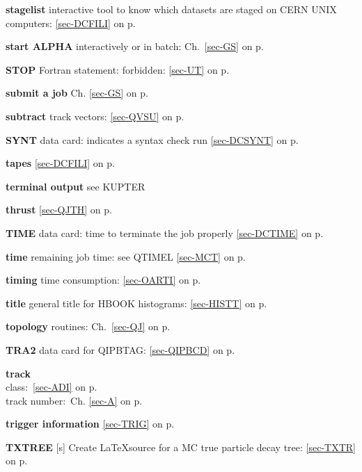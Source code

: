  \item{\bf stagelist  }interactive tool to know which datasets are staged on CERN UNIX computers:
                           \ref{sec-DCFILI} on p.~\pageref{sec-DCFILI}\\
 \item{\bf start ALPHA }interactively or in batch: Ch.~\ref{sec-GS} on p.~\pageref{sec-GS}\\
 \item{\bf STOP    }Fortran statement: forbidden:
 \ref{sec-UT} on p.~\pageref{sec-UT}\\
 \item{\bf submit a job    }Ch. \ref{sec-GS} on p.~\pageref{sec-GS}\\
 \item{\bf subtract    }track vectors: \ref{sec-QVSU} on p.~\pageref{sec-QVSU}\\
 \item{\bf SYNT    }data card: indicates a syntax check run
 \ref{sec-DCSYNT} on p.~\pageref{sec-DCSYNT}
 
 
 \item{\bf tapes }\ref{sec-DCFILI} on p.~\pageref{sec-DCFILI}\\
 \item{\bf terminal output }see KUPTER\\
 \item{\bf thrust }\ref{sec-QJTH} on p.~\pageref{sec-QJTH}\\
 \item{\bf TIME    }data card: time to terminate the job properly
 \ref{sec-DCTIME} on p.~\pageref{sec-DCTIME}\\
 \item{\bf time    }remaining job time: see QTIMEL \ref{sec-MCT} on p.~\pageref{sec-MCT}\\
 \item{\bf timing  }time consumption: \ref{sec-OARTI} on p.~\pageref{sec-OARTI}\\
 \item{\bf title   }general title for HBOOK histograms: \ref{sec-HISTT} on p.~\pageref{sec-HISTT}\\
 \item{\bf topology }routines: Ch.~\ref{sec-QJ} on p.~\pageref{sec-QJ}\\
 \item{\bf TRA2    }data card for QIPBTAG: \ref{sec-QIPBCD} on p.~\pageref{sec-QIPBCD}\\
 \item{\bf track }\\
 \subitem class:~\ref{sec-ADI} on p.~\pageref{sec-ADI}\\
 \subitem track number:~Ch. \ref{sec-A} on p.~\pageref{sec-A}\\
 \item{\bf trigger information }\ref{sec-TRIG} on p.~\pageref{sec-TRIG}\\
 \item{\bf TXTREE }[s] Create \LaTeX source for a MC true particle decay tree:
 \ref{sec-TXTR} on p.~\pageref{sec-TXTR}
 

